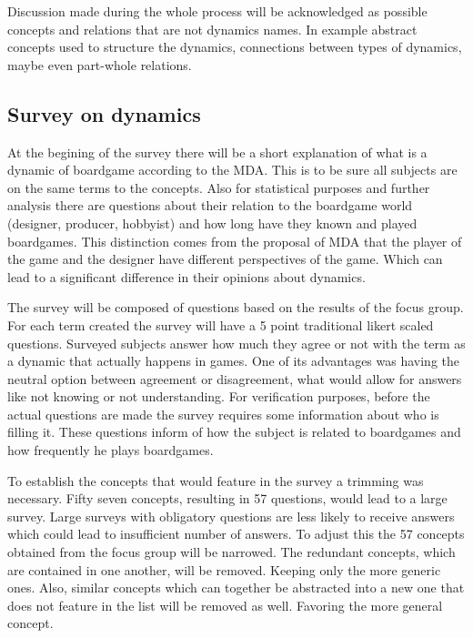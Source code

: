 Discussion made during the whole process will be acknowledged as possible concepts and relations that are not dynamics names. In example abstract concepts used to structure the dynamics, connections between types of dynamics, maybe even part-whole relations.



\subsection{Survey on dynamics}

At the begining of the survey there will be a short explanation of what is a dynamic of boardgame according to the MDA. This is to be sure all subjects are on the same terms to the concepts. Also for statistical purposes and further analysis there are questions about their relation to the boardgame world (designer, producer, hobbyist) and how long have they known and played boardgames. This distinction comes from the proposal of MDA that the player of the game and the designer have different perspectives of the game. Which can lead to a significant difference in their opinions about dynamics.

The survey will be composed of questions based on the results of the focus group. For each term created the survey will have a 5 point traditional likert scaled questions. Surveyed subjects answer how much they agree or not with the term as a dynamic that actually happens in games. One of its advantages was having the neutral option between agreement or disagreement, what would allow for answers like not knowing or not understanding. For verification purposes, before the actual questions are made the survey requires some information about who is filling it. These questions inform of how the subject is related to boardgames and how frequently he plays boardgames. \citep{devellis2016scale}

To establish the concepts that would feature in the survey a trimming was necessary. Fifty seven concepts, resulting in 57 questions, would lead to a large survey. Large surveys with obligatory questions are less likely to receive answers which could lead to insufficient number of answers. To adjust this the 57 concepts obtained from the focus group will be narrowed. The redundant concepts, which are contained in one another, will be removed. Keeping only the more generic ones. Also, similar concepts which can together be abstracted into a new one that does not feature in the list will be removed as well. Favoring the more general concept. \citep{malhotra2012pesquisaMarketing}

